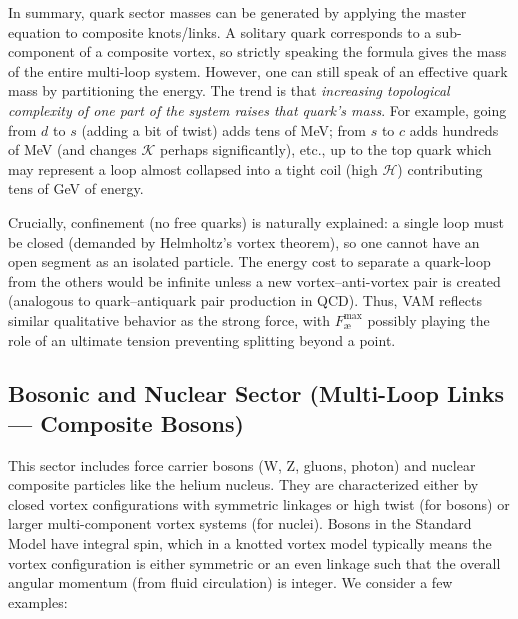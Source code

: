 \documentclass[11pt]{article}
\begin{document}
    In summary, quark sector masses can be generated by applying the master equation to composite knots/links. A solitary quark corresponds to a sub-component of a composite vortex, so strictly speaking the formula gives the mass of the entire multi-loop system. However, one can still speak of an effective quark mass by partitioning the energy. The trend is that \textit{increasing topological complexity of one part of the system raises that quark’s mass}. For example, going from $d$ to $s$ (adding a bit of twist) adds tens of MeV; from $s$ to $c$ adds hundreds of MeV (and changes $\mathcal{K}$ perhaps significantly), etc., up to the top quark which may represent a loop almost collapsed into a tight coil (high $\mathcal{H}$) contributing tens of GeV of energy.

    Crucially, confinement (no free quarks) is naturally explained: a single loop must be closed (demanded by Helmholtz’s vortex theorem), so one cannot have an open segment as an isolated particle. The energy cost to separate a quark-loop from the others would be infinite unless a new vortex–anti-vortex pair is created (analogous to quark–antiquark pair production in QCD). Thus, VAM reflects similar qualitative behavior as the strong force, with $F^{\max}_{\text{\ae}}$ possibly playing the role of an ultimate tension preventing splitting beyond a point.

    \subsection{Bosonic and Nuclear Sector (Multi-Loop Links — Composite Bosons)}

    This sector includes force carrier bosons (W, Z, gluons, photon) and nuclear composite particles like the helium nucleus. They are characterized either by closed vortex configurations with symmetric linkages or high twist (for bosons) or larger multi-component vortex systems (for nuclei). Bosons in the Standard Model have integral spin, which in a knotted vortex model typically means the vortex configuration is either symmetric or an even linkage such that the overall angular momentum (from fluid circulation) is integer. We consider a few examples:
\end{document}
